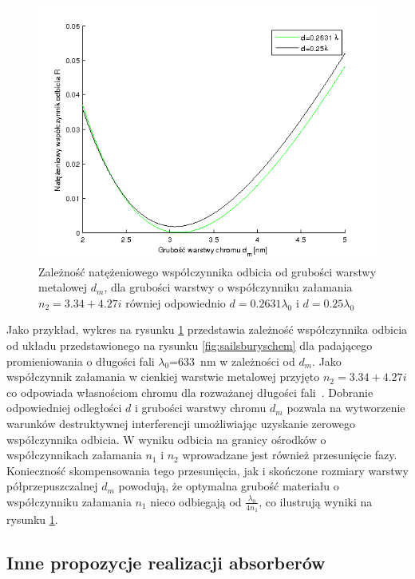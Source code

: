 \begin{figure}[tb]
	\centering
	\includegraphics[width=\textwidth]{images/pml/sailsbury-res.png}
	\caption{Zależność natężeniowego współczynnika odbicia od grubości warstwy metalowej $d_m$, dla grubości warstwy o współczynniku załamania $n_2=3.34 + 4.27i$ równiej odpowiednio $d=0.2631\lambda_0$ i $d=0.25\lambda_0$}
	\label{fig:sailsburyres}
\end{figure}

Jako przykład,  wykres na rysunku \ref{fig:sailsburyres}  przedstawia zależność współczynnika odbicia od układu przedstawionego na rysunku \ref{fig:sailsburyschem} dla padającego promieniowania o długości fali $\lambda_0$=633~nm w zależności od $d_m$. Jako współczynnik załamania w cienkiej warstwie metalowej przyjęto $n_2=3.34+4.27i$ co odpowiada własnościom chromu dla rozważanej długości fali~\cite{ordal1983optical}. Dobranie odpowiedniej odległości $d$ i grubości warstwy chromu $d_m$ pozwala na wytworzenie warunków destruktywnej interferencji umożliwiając uzyskanie zerowego współczynnika odbicia. W wyniku odbicia na granicy ośrodków o współczynnikach załamania $n_1$ i $n_2$ wprowadzane jest również przesunięcie fazy. Konieczność skompensowania tego przesunięcia, jak i skończone rozmiary warstwy półprzepuszczalnej $d_m$ powodują, że optymalna grubość materiału o współczynniku załamania $n_1$ nieco odbiegają od $\frac{\lambda_0}{4 n_1}$, co ilustrują wyniki na rysunku \ref{fig:sailsburyres}. 

\subsection{Inne propozycje realizacji absorberów}

